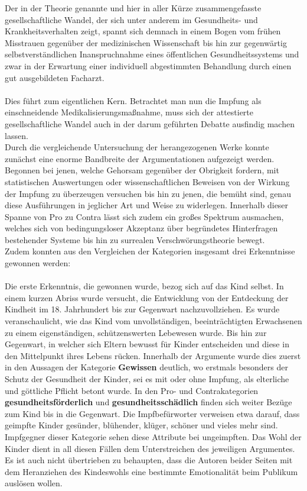 \documentclass[
    a4paper,
    12pt,
    hyphens,
    chapterprefix=true,
    headheight=33pt,
    footheight=29pt,
    headings=optiontohead, %
]{scrartcl}
\begin{document}
{Der in der Theorie genannte und hier in aller Kürze zusammengefasste gesellschaftliche Wandel, der sich unter anderem im Gesundheits- und Krankheitsverhalten zeigt, spannt sich demnach in einem Bogen vom frühen Misstrauen gegenüber der medizinischen Wissenschaft bis hin zur gegenwärtig selbstverständlichen Inanspruchnahme eines öffentlichen 
Gesundheitssystems und zwar in der Erwartung einer individuell abgestimmten Behandlung 
durch einen gut ausgebildeten Facharzt.\\
\\
Dies führt zum eigentlichen Kern. Betrachtet man nun die Impfung als einschneidende Medikalisierungsmaßnahme, muss sich der attestierte gesellschaftliche Wandel auch in der darum geführten Debatte ausfindig machen lassen. \\
Durch die vergleichende Untersuchung der herangezogenen Werke konnte zunächst eine enorme Bandbreite der Argumentationen aufgezeigt werden. Begonnen bei jenen, welche Gehorsam gegenüber der Obrigkeit fordern, mit statistischen Auswertungen oder wissenschaftlichen 
Beweisen von der Wirkung der Impfung zu überzeugen versuchen bis hin zu jenen, die bemüht sind, genau diese Ausführungen in jeglicher Art und Weise zu widerlegen. Innerhalb dieser Spanne von Pro zu Contra
lässt sich zudem ein großes Spektrum ausmachen, welches sich von bedingungsloser Akzeptanz über begründetes Hinterfragen bestehender Systeme bis hin zu surrealen Verschwörungstheorie bewegt.\\
Zudem konnten aus den Vergleichen der Kategorien insgesamt drei Erkenntnisse gewonnen werden:\\
\\
Die erste Erkenntnis, die gewonnen wurde, bezog sich auf das Kind selbst. 
In einem kurzen Abriss wurde versucht, die Entwicklung von der Entdeckung der 
Kindheit im 18. Jahrhundert bis zur Gegenwart nachzuvollziehen. Es wurde 
veranschaulicht, wie das Kind vom unvollständigen, beeinträchtigten Erwachsenen zu 
einem eigenständigen, schützenswerten Lebewesen wurde. Bis hin zur Gegenwart, in welcher sich 
Eltern bewusst für Kinder entscheiden und diese in den Mittelpunkt ihres 
Lebens rücken. Innerhalb der Argumente wurde dies zuerst in den Aussagen der Kategorie 
\textbf{Gewissen} deutlich, wo erstmals besonders der
Schutz der Gesundheit der Kinder, sei es mit oder ohne Impfung, als 
elterliche und göttliche Pflicht betont wurde. In den Pro- und Contrakategorien \textbf{gesundheitsförderlich} und \textbf{gesundheitsschädlich} finden sich weiter Bezüge zum Kind bis in die Gegenwart. Die Impfbefürworter verweisen etwa darauf, dass geimpfte Kinder gesünder, blühender, klüger, schöner und vieles mehr sind. Impfgegner dieser Kategorie sehen diese Attribute bei ungeimpften. Das Wohl der Kinder dient in all diesen Fällen dem Unterstreichen des jeweiligen Argumentes. Es ist auch nicht übertrieben zu behaupten, dass die Autoren beider Seiten mit dem Heranziehen des Kindeswohls eine bestimmte Emotionalität beim Publikum auslösen wollen.\\
}
\end{document}
